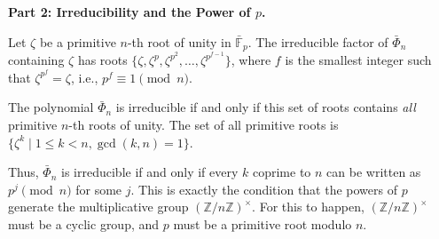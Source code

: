 \begin{solution}
\bigskip

\textbf{Part 2: Irreducibility and the Power of $p$.}

Let $\zeta$ be a primitive $n$-th root of unity in $\bar{\mathbb{F}}_p$. The irreducible factor of $\bar{\Phi}_n$ containing $\zeta$ has roots $\{\zeta, \zeta^p, \zeta^{p^2}, \dots, \zeta^{p^{f-1}}\}$, where $f$ is the smallest integer such that $\zeta^{p^f} = \zeta$, i.e., $p^f \equiv 1 \pmod n$.

\bigskip

The polynomial $\bar{\Phi}_n$ is irreducible if and only if this set of roots contains \textit{all} primitive $n$-th roots of unity. The set of all primitive roots is $\{\zeta^k \mid 1 \leq k < n, \gcd(k, n) = 1\}$.

\bigskip

Thus, $\bar{\Phi}_n$ is irreducible if and only if every $k$ coprime to $n$ can be written as $p^j \pmod n$ for some $j$. This is exactly the condition that the powers of $p$ generate the multiplicative group $(\mathbb{Z}/n\mathbb{Z})^\times$. For this to happen, $(\mathbb{Z}/n\mathbb{Z})^\times$ must be a cyclic group, and $p$ must be a primitive root modulo $n$.
\end{solution}

